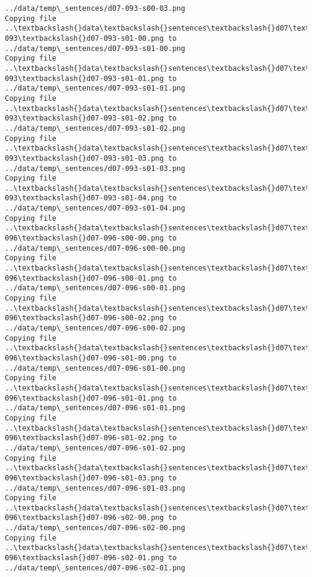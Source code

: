 \documentclass[11pt]{article}
\begin{document}
\begin{Verbatim}[commandchars=\\\{\}]
../data/temp\_sentences/d07-093-s00-03.png
Copying file ..\textbackslash{}data\textbackslash{}sentences\textbackslash{}d07\textbackslash{}d07-093\textbackslash{}d07-093-s01-00.png to
../data/temp\_sentences/d07-093-s01-00.png
Copying file ..\textbackslash{}data\textbackslash{}sentences\textbackslash{}d07\textbackslash{}d07-093\textbackslash{}d07-093-s01-01.png to
../data/temp\_sentences/d07-093-s01-01.png
Copying file ..\textbackslash{}data\textbackslash{}sentences\textbackslash{}d07\textbackslash{}d07-093\textbackslash{}d07-093-s01-02.png to
../data/temp\_sentences/d07-093-s01-02.png
Copying file ..\textbackslash{}data\textbackslash{}sentences\textbackslash{}d07\textbackslash{}d07-093\textbackslash{}d07-093-s01-03.png to
../data/temp\_sentences/d07-093-s01-03.png
Copying file ..\textbackslash{}data\textbackslash{}sentences\textbackslash{}d07\textbackslash{}d07-093\textbackslash{}d07-093-s01-04.png to
../data/temp\_sentences/d07-093-s01-04.png
Copying file ..\textbackslash{}data\textbackslash{}sentences\textbackslash{}d07\textbackslash{}d07-096\textbackslash{}d07-096-s00-00.png to
../data/temp\_sentences/d07-096-s00-00.png
Copying file ..\textbackslash{}data\textbackslash{}sentences\textbackslash{}d07\textbackslash{}d07-096\textbackslash{}d07-096-s00-01.png to
../data/temp\_sentences/d07-096-s00-01.png
Copying file ..\textbackslash{}data\textbackslash{}sentences\textbackslash{}d07\textbackslash{}d07-096\textbackslash{}d07-096-s00-02.png to
../data/temp\_sentences/d07-096-s00-02.png
Copying file ..\textbackslash{}data\textbackslash{}sentences\textbackslash{}d07\textbackslash{}d07-096\textbackslash{}d07-096-s01-00.png to
../data/temp\_sentences/d07-096-s01-00.png
Copying file ..\textbackslash{}data\textbackslash{}sentences\textbackslash{}d07\textbackslash{}d07-096\textbackslash{}d07-096-s01-01.png to
../data/temp\_sentences/d07-096-s01-01.png
Copying file ..\textbackslash{}data\textbackslash{}sentences\textbackslash{}d07\textbackslash{}d07-096\textbackslash{}d07-096-s01-02.png to
../data/temp\_sentences/d07-096-s01-02.png
Copying file ..\textbackslash{}data\textbackslash{}sentences\textbackslash{}d07\textbackslash{}d07-096\textbackslash{}d07-096-s01-03.png to
../data/temp\_sentences/d07-096-s01-03.png
Copying file ..\textbackslash{}data\textbackslash{}sentences\textbackslash{}d07\textbackslash{}d07-096\textbackslash{}d07-096-s02-00.png to
../data/temp\_sentences/d07-096-s02-00.png
Copying file ..\textbackslash{}data\textbackslash{}sentences\textbackslash{}d07\textbackslash{}d07-096\textbackslash{}d07-096-s02-01.png to
../data/temp\_sentences/d07-096-s02-01.png

\end{Verbatim}
\end{document}
